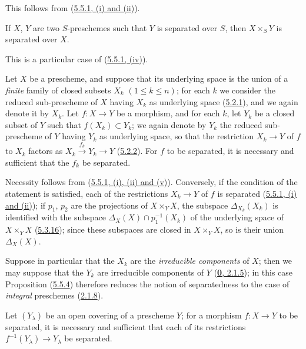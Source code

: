 This follows from (\hyperref[I.5.5.1]{5.5.1, (i) and (ii)}).

\begin{corollary}[5.5.3]
\label{I.5.5.3}
If $X$, $Y$ are two $S$-preschemes such that $Y$ is separated over
$S$, then $X\times_S Y$ is separated over $X$.
\end{corollary}

This is a particular case of (\hyperref[I.5.5.1]{5.5.1, (iv)}).

\begin{proposition}[5.5.4]
\label{I.5.5.4}
Let $X$ be a prescheme, and suppose that its underlying space is the union of
a \emph{finite} family of closed subsets $X_k$ $(1\leq k\leq n)$; for each $k$ we
consider the reduced sub-prescheme of $X$ having $X_k$ as underlying space
\textup{(\hyperref[I.5.2.1]{5.2.1})}, and we again denote it by $X_k$. Let
$f:X\to Y$ be a morphism, and for each $k$, let $Y_k$ be a closed subset of
$Y$ such that $f(X_k)\subset Y_k$; we again denote by $Y_k$ the reduced
sub-prescheme of $Y$ having $Y_k$ as underlying space, so that the restriction
$X_k\to Y$ of $f$ to $X_k$ factors as
$X_k\xrightarrow{f_k}Y_k\to Y$ \textup{(\hyperref[I.5.2.2]{5.2.2})}. For $f$
to be separated, it is necessary and sufficient that the $f_k$ be separated.
\end{proposition}

Necessity follows from
(\hyperref[I.5.5.1]{5.5.1, (i), (ii) and (v)}). Conversely, if the
condition of the statement is satisfied, each of the restrictions $X_k\to Y$
of $f$ is separated (\hyperref[I.5.5.1]{5.5.1, (i) and (ii)}); if $p_1$,
$p_2$ are the projections of $X\times_Y X$, the subspace
$\Delta_{X_k}(X_k)$ is identified with the subspace
$\Delta_X(X)\cap p_1^{-1}(X_k)$ of the underlying space of
$X\times_Y X$ (\hyperref[I.5.3.16]{5.3.16}); since these subspaces are
closed in $X\times_Y X$, so is their union $\Delta_X(X)$.

Suppose in particular that the $X_k$ are the
\emph{irreducible components} of $X$; then we may suppose that the $Y_k$
are irreducible components of $Y$
(\hyperref[0.2.1.5]{\textbf{0}, 2.1.5}); in this case Proposition
(\hyperref[I.5.5.4]{5.5.4}) therefore reduces the notion of separatedness
to the case of \emph{integral} preschemes (\hyperref[I.2.1.8]{2.1.8}).


\begin{proposition}[5.5.5]
\label{I.5.5.5}
Let $(Y_\lambda)$ be an open covering of a prescheme $Y$; for a
morphism $f:X\to Y$ to be separated, it is necessary and sufficient that each
of its restrictions $f^{-1}(Y_\lambda)\to Y_\lambda$ be separated.
\end{proposition}

